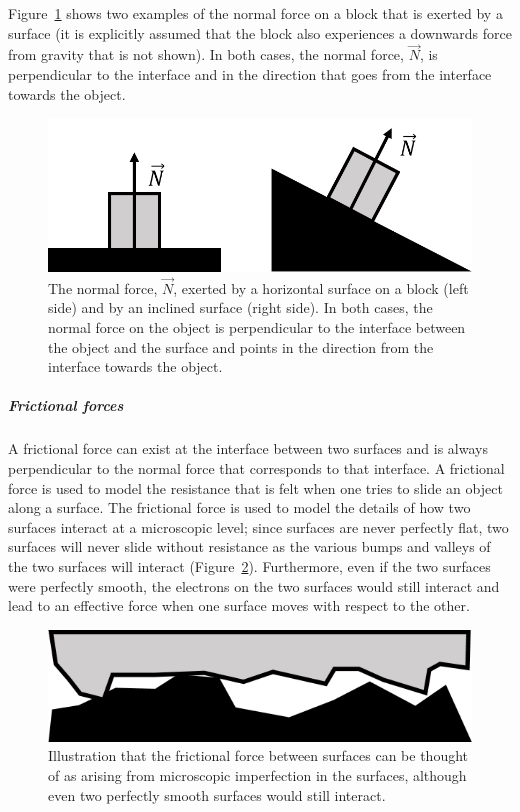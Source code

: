 Figure~\ref{fig:newtonslaws:normal} shows two examples of the normal force on a block that is exerted by a surface (it is explicitly assumed that the block also experiences a downwards force from gravity that is not shown). In both cases, the normal force, $\vec N$, is perpendicular to the interface and in the direction that goes from the interface towards the object.

\begin{figure}[!htbp]
\centering
\includegraphics[width=0.5\linewidth]{files/normal-c7095ad7e022213578762c7aadd99feb.png}
\caption[]{The normal force, $\vec N$, exerted by a horizontal surface on a block (left side) and by an inclined surface (right side). In both cases, the normal force on the object is perpendicular to the interface between the object and the surface and points in the direction from the interface towards the object.}
\label{fig:newtonslaws:normal}
\end{figure}

\subparagraph{Frictional forces}

A frictional force can exist at the interface between two surfaces and is always perpendicular to the normal force that corresponds to that interface. A frictional force is used to model the resistance that is felt when one tries to slide an object along a surface. The frictional force is used to model the details of how two surfaces interact at a microscopic level; since surfaces are never perfectly flat, two surfaces will never slide without resistance as the various bumps and valleys of the two surfaces will interact (Figure~\ref{fig:newtonslaws:fsurfaces}). Furthermore, even if the two surfaces were perfectly smooth, the electrons on the two surfaces would still interact and lead to an effective force when one surface moves with respect to the other.

\begin{figure}[!htbp]
\centering
\includegraphics[width=0.3\linewidth]{files/fsurfaces-59ce016a44b5851dc6c2883d2412cfa1.png}
\caption[]{Illustration that the frictional force between surfaces can be thought of as arising from microscopic imperfection in the surfaces, although even two perfectly smooth surfaces would still interact.}
\label{fig:newtonslaws:fsurfaces}
\end{figure}

